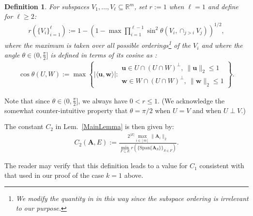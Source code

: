 \documentclass[9pt,twocolumn]{pnas-new}
\newtheorem{definition}{Definition}
\begin{document}
\begin{definition}\label{SpecialSupportSet}\label{FriedrichsDefinition}
For subspaces $V_1, \ldots, V_\ell \subseteq \mathbb{R}^m$, set $r := 1$ when $\ell = 1$ and define for $\ell \geq 2$:
\begin{align*}
r(\{V_i\}_{i=1}^\ell) := 1 - \left(1 -  \max \prod_{i=1}^{\ell-1} \sin^2  \theta \left(V_i, \cap_{j>i} V_j \right)  \right)^{1/2},
\end{align*} 
%
where the maximum is taken over all possible orderings\footnote{We modify the quantity in \cite{Deutsch12} in this way since the subspace ordering is irrelevant to our purpose.} of the $V_i$ and where the angle $\theta \in (0,\frac{\pi}{2}]$ is defined in terms of its cosine as \cite[Def.~9.4]{Deutsch12}:
\begin{align*}
\cos{\theta(U,W)} := \max\left\{ |\langle \mathbf{u}, \mathbf{w} \rangle|: \substack{ \mathbf{u} \in U \cap (U \cap W)^\perp, \ \|\mathbf{u}\|_2 \leq 1 \\ \mathbf{w} \in W \cap (U \cap W)^\perp, \  \|\mathbf{w}\|_2 \leq 1 } \right\}.
\end{align*}
\end{definition}
Note that since $\theta \in (0,\frac{\pi}{2}]$, we always have $0 < r \leq 1$. (We acknowledge the somewhat counter-intuitive property that $\theta =  \pi/2$ when $U = V$ and when $U \perp V$.)  %

The constant $C_2$ in Lem.~\ref{MainLemma} is then given by:  %
\begin{align}
C_2(\mathbf{A}, E) := \frac{ 2^{|E|} \max_{i \in [m]} \|\mathbf{A}_i\|_2}{ \min_{F \subseteq E} r( \{ \text{Span}\{\mathbf{A}_{S}\} \}_{S \in F}) }.
\end{align}

The reader may verify that this definition leads to a value for $C_1$ consistent with that used in our proof of the case $k=1$ above.
\end{document}
